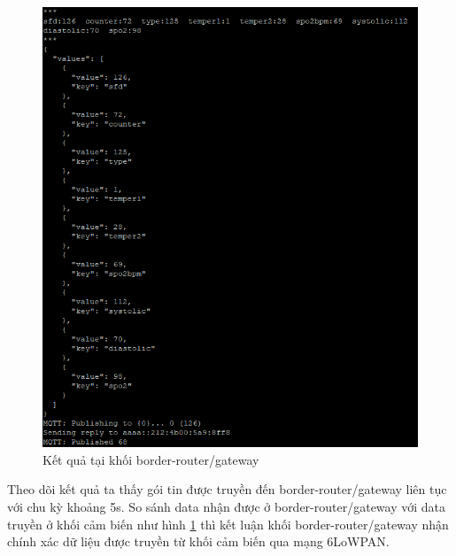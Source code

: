 \documentclass{report}
\begin{document}
\begin{figure}[h]
	\centering
	\includegraphics[scale = 0.7]{fig67.png}
	\caption{Kết quả tại khối border-router/gateway}
	\label{fig:Graph67}
\end{figure}
Theo dõi kết quả ta thấy gói tin được truyền đến border-router/gateway liên tục với chu kỳ khoảng 5s. So sánh data nhận được ở border-router/gateway với data truyền ở khối cảm biến như hình \ref{fig:Graph67} thì kết luận khối border-router/gateway nhận chính xác dữ liệu được truyền từ khối cảm biến qua mạng 6LoWPAN.
\newpage
\end{document}
